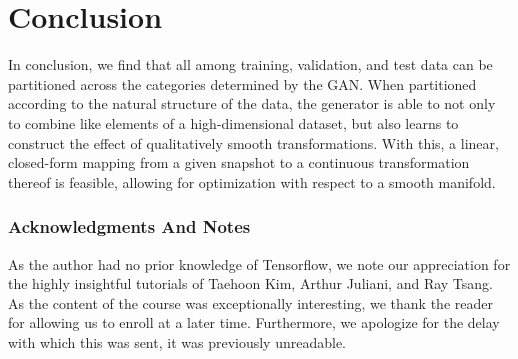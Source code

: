 \documentclass{article}
\begin{document}
\section{Conclusion}
	In conclusion, we find that all among training, validation, and test data can be partitioned across the categories determined by the GAN.  When partitioned according to the natural structure of the data, the generator is able to not only to combine like elements of a high-dimensional dataset, but also learns to construct the effect of qualitatively smooth transformations.  With this, a linear, closed-form mapping from a given snapshot to a continuous transformation thereof is feasible, allowing for optimization with respect to a smooth manifold.\label{GenPCA2} 

\subsubsection*{Acknowledgments And Notes}

As the author had no prior knowledge of Tensorflow, we note our appreciation for the highly insightful tutorials of Taehoon Kim, Arthur Juliani, and Ray Tsang.  As the content of the course was exceptionally interesting, we thank the reader for allowing us to enroll at a later time. Furthermore, we apologize for the delay with which this was sent, it was previously unreadable.








\end{document}
